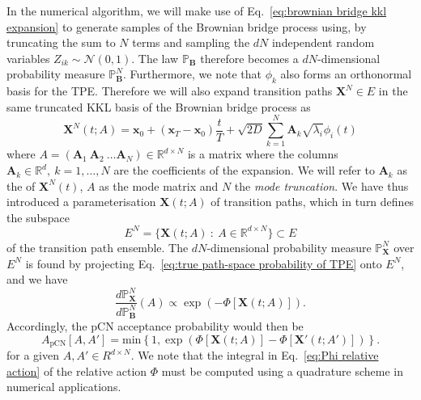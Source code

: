 In the numerical algorithm, we will make use of Eq.~\ref{eq:brownian bridge kkl expansion} to generate samples of the Brownian bridge process using, by truncating the sum to $N$ terms and sampling the $d N$ independent random variables $Z_{ik} \sim \mathcal{N}(0, 1)$. The law $\mathbb{P}_\mathbf{B}$ therefore becomes a $d N$-dimensional probability measure $\mathbb{P}^N_\mathbf{B}$. Furthermore, we note that $\phi_k$ also forms an orthonormal basis for the TPE. Therefore we will also expand transition paths $\mathbf{X}^N \in E$ in the same truncated KKL basis of the Brownian bridge process as
\begin{equation} \label{eq:KKL expansion of transition paths}
	\mathbf{X}^N(t;A) = \mathbf{x}_0 + (\mathbf{x}_T - \mathbf{x}_0) \frac{t}{T} +\sqrt{2 D} \sum_{k=1}^N \mathbf{A}_k \sqrt{\lambda_i} \phi_i(t)
\end{equation}
where $A = (\mathbf{A}_1\ \mathbf{A}_2\ \dots \mathbf{A}_N) \in \mathbb{R}^{d \times N}$ is a matrix where the columns $\mathbf{A}_k \in \mathbb{R}^d,\ k=1,\dots,N$ are the coefficients of the expansion. We will refer to $\mathbf{A}_k$ as the  of $\mathbf{X}^N(t)$, $A$ as the mode matrix and $N$ the \textit{mode truncation}. We have thus introduced a parameterisation $\mathbf{X}(t ; A)$ of transition paths, which in turn defines the subspace
\begin{equation} \label{eq:finite dimensional TPE}
	E^N = \{ \mathbf{X}(t;A)\ :\ A \in \mathbb{R}^{d \times N} \} \subset E
\end{equation}
of the transition path ensemble. The $d N$-dimensional probability measure $\mathbb{P}^N_\mathbf{X}$ over $E^N$ is found by projecting Eq.~\ref{eq:true path-space probability of TPE} onto $E^N$, and we have
\begin{equation}
	\frac{d \mathbb{P}^N_\mathbf{X}}{d \mathbb{P}^N_\mathbf{B}}(A) \propto \exp( - \Phi[\mathbf{X}(t;A)] ).
\end{equation}
Accordingly, the pCN acceptance probability would then be
\begin{equation} \label{eq:truncated pCN acceptance probability}
A_\text{pCN}[A, A'] = \text{min} \left\{ 1, 
\exp \left( \Phi[\mathbf{X}(t;A)] - \Phi[\mathbf{X}'(t;A')] \right)
\right\}.
\end{equation}
for a given $A, A' \in \mathbb{}R^{d \times N}$. We note that the integral in Eq.~\ref{eq:Phi relative action} of the relative action $\Phi$ must be computed using a quadrature scheme in numerical applications. %

